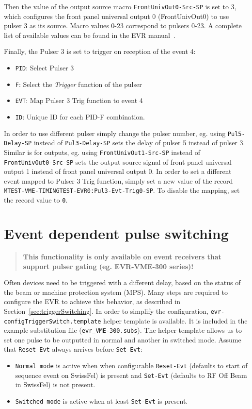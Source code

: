 \documentclass[12pt,a4paper]{article}
\begin{document}
Then the value of the output source macro \texttt{FrontUnivOut0-Src-SP} is set to 3, which configures the front panel universal output 0 (FrontUnivOut0) to use pulser 3 as its source. Macro values 0-23 correspond to pulsers 0-23. A complete list of available values can be found in the EVR manual~\cite{evr_manual}.

Finally, the Pulser 3 is set to trigger on reception of the event 4:
\begin{itemize}
	\item \texttt{PID}: Select Pulser 3
	\item \texttt{F}: Select the \textit{Trigger} function of the pulser
	\item \texttt{EVT}: Map Pulser 3 Trig function to event 4
	\item \texttt{ID}: Unique ID for each PID-F combination.
\end{itemize}

In order to use different pulser simply change the pulser number, eg. using \texttt{Pul5-Delay-SP} instead of \texttt{Pul3-Delay-SP} sets the delay of pulser 5 instead of pulser 3.
Similar is for outputs, eg. using \texttt{FrontUnivOut1-Src-SP} instead of \texttt{FrontUnivOut0-Src-SP} sets the output source signal of front panel universal output 1 instead of front panel universal output 0. In order to set a different event mapped to Pulser 3 Trig function, simply set a new value of the record \texttt{MTEST-VME-TIMINGTEST-EVR0:Pul3-Evt-Trig0-SP}. To disable the mapping, set the record value to \texttt{0}.

\section{Event dependent pulse switching}\label{sec:2pulsers}
\begin{quote}
\textbf{This functionality is only available on event receivers that support pulser gating (eg. EVR-VME-300 series)!}
\end{quote}
Often devices need to be triggered with a different delay, based on the status of the beam or machine protection system (MPS). Many steps are required to configure the EVR to achieve this behavior, as described in Section~\ref{sec:triggerSwitching}. In order to simplify the configuration, \texttt{evr-configTriggerSwitch.template} helper template is available. It is included in the example substitution file (\texttt{evr\_VME-300.subs}). The helper template allows us to set one pulse to be outputted in normal and another in switched mode. Assume that \texttt{Reset-Evt} always arrives before \texttt{Set-Evt}:
\begin{itemize}
\item \texttt{Normal mode} is active when when configurable \texttt{Reset-Evt} (defaults to start of sequence event on SwissFel) is present and \texttt{Set-Evt} (defaults to RF Off Beam in SwissFel) is not present.
\item \texttt{Switched mode} is active when at least \texttt{Set-Evt} is present.
\end{itemize}
\end{document}
